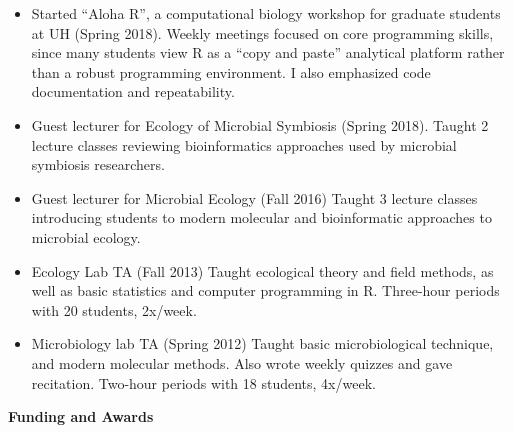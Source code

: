 \documentclass{article}
\def\yen{{\setbox0=\hbox{Y}Y\kern-.97\wd0\vbox{\hrule height.1ex
  width.98\wd0\kern.33ex\hrule height.1ex width.98\wd0\kern.45ex}}}
\begin{document}
\begin{itemize}[noitemsep,topsep=0pt, leftmargin=5mm]
  \item Started “Aloha R”, a computational biology workshop for graduate students at UH (Spring 2018). Weekly meetings focused on core programming skills, since many students view R as a “copy and paste” analytical platform rather than a robust programming environment. I also emphasized code documentation and repeatability.
  \item Guest lecturer for Ecology of Microbial Symbiosis (Spring 2018). Taught 2 lecture classes reviewing bioinformatics approaches used by microbial symbiosis researchers.
  \item Guest lecturer for Microbial Ecology (Fall 2016) Taught 3 lecture classes introducing students to modern molecular and bioinformatic approaches to microbial ecology.
  \item Ecology Lab TA (Fall 2013) Taught ecological theory and field methods, as well as basic statistics and computer programming in R. Three-hour periods with 20 students, 2x/week.
  \item Microbiology lab TA (Spring 2012) Taught basic microbiological technique, and modern molecular methods. Also wrote weekly quizzes and gave recitation. Two-hour periods with 18 students, 4x/week.
\end{itemize}
\vspace{3mm}
{\large  \textbf{Funding and Awards}}
\end{document}
